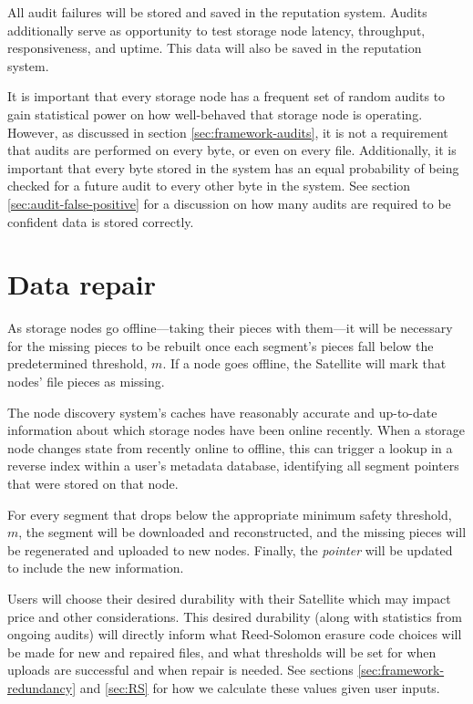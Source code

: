 \documentclass[8pt,fleqn,openany]{book}
\begin{document}
All audit failures will be stored and saved in the reputation system.
Audits additionally serve as opportunity to test storage node latency,
throughput, responsiveness, and uptime. This data will also be saved in the
reputation system.

It is important that every storage node has a frequent set of random audits to
gain statistical power on how well-behaved that storage node is operating.
However, as discussed in section \ref{sec:framework-audits}, it is
not a requirement that audits are performed on every byte, or even on every
file.
Additionally, it is important that every byte stored in the system has an equal
probability of being checked for a future audit to every other byte in the
system. See section \ref{sec:audit-false-positive} for a discussion on
how many audits are required to be confident data is stored correctly.


\section{Data repair}\label{sec:concrete-data-repair}

As storage nodes go offline---taking their pieces with them---it will
be necessary for the missing pieces to be rebuilt once each segment's pieces
fall below the predetermined threshold, $m$. If a node goes offline, the
Satellite will mark that nodes' file pieces as missing.

The node discovery system's caches have reasonably accurate and
up-to-date information about which storage nodes have been online recently.
When a storage node changes state from recently online to offline, this can
trigger a lookup in a reverse index within a user's metadata database,
identifying all segment pointers that were stored on that node.

For every segment that drops below the appropriate minimum safety
threshold, $m$, the segment will be downloaded and reconstructed, and the
missing pieces will be regenerated and uploaded to new nodes. Finally, the
{\em pointer} will be updated to include the new information.

Users will choose their desired durability with their Satellite
which may impact price and other considerations. This desired durability (along with
statistics from ongoing audits) will directly inform what Reed-Solomon erasure
code choices will be made for new and repaired files, and what thresholds
will be set for when uploads are successful and when repair is needed. See
sections \ref{sec:framework-redundancy} and \ref{sec:RS} for how we calculate
these values given user inputs.
\end{document}
